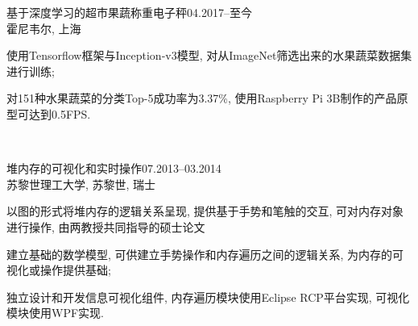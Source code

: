 \documentclass[11pt]{article} %
\begin{document}
\begin{minipage}[t]{0.44\textwidth}
\normalsize{基于深度学习的超市果蔬称重电子秤\hfill04.2017--至今}\\
\small 霍尼韦尔, 上海\\
\small
\begin{inparaitem} 
\item 使用Tensorflow框架与Inception-v3模型, 对从ImageNet筛选出来的水果蔬菜数据集进行训练;\\
\item 对151种水果蔬菜的分类Top-5成功率为3.37\%, 使用Raspberry Pi 3B制作的产品原型可达到0.5FPS.
\end{inparaitem}
\\\par 

\normalsize{堆内存的可视化和实时操作\hfill07.2013--03.2014}\\
\small 苏黎世理工大学, 苏黎世, 瑞士\\
\small
\begin{inparaitem} 
\item 以图的形式将堆内存的逻辑关系呈现, 提供基于手势和笔触的交互, 可对内存对象进行操作, 由两教授共同指导的硕士论文\\
\item 建立基础的数学模型, 可供建立手势操作和内存遍历之间的逻辑关系, 为内存的可视化或操作提供基础;\\
\item 独立设计和开发信息可视化组件, 内存遍历模块使用Eclipse RCP平台实现, 可视化模块使用WPF实现.\\
\end{inparaitem}
\\\par 



\end{minipage}
\end{document}
